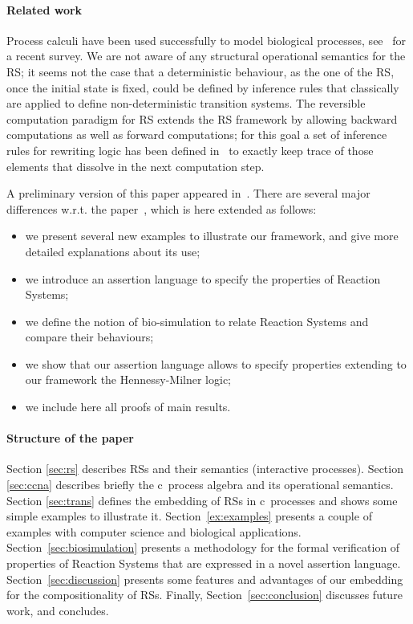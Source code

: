 \paragraph{Related work}

Process calculi have been used successfully to model
biological processes, see~\cite{BBDFH18} for a recent survey.
We are not aware of any 
structural operational semantics for the RS; it seems not the case
that a deterministic behaviour, as the one of the RS, once the initial state is 
fixed, could be defined by inference rules that classically are applied 
to define non-deterministic transition systems.
The reversible computation paradigm for RS extends the RS framework  by
allowing  backward computations as well as forward computations; for this 
goal a set of inference rules for rewriting logic has been 
defined in~\cite{10.1007/978-3-319-73359-3_3}
to exactly keep trace of those elements that  dissolve in the next 
computation step.


A preliminary version of this paper appeared in~\cite{BBF19}.
There are several major differences w.r.t. the paper~\cite{BBF19}, which is here extended as follows:
\begin{itemize}
\item we present several new examples to illustrate our framework,
and give more detailed explanations about its use;
\item we introduce an assertion language to specify the properties of Reaction Systems;
\item we define the notion of bio-simulation to relate Reaction Systems and compare their behaviours;
\item we show that our assertion language allows to specify properties extending to our
framework the Hennessy-Milner logic;
\item we include here all proofs of main results.
\end{itemize}
 
\paragraph{Structure of the paper} 

Section \ref{sec:rs} 
describes RSs and their semantics (interactive processes).
Section \ref{sec:ccna} describes briefly the c\CNA \ process algebra and
its operational semantics.
Section \ref{sec:trans} defines the embedding of RSs in
c\CNA \ processes and shows some simple examples to illustrate 
it.
Section~\ref{ex:examples} presents a couple of examples with computer science and biological applications.
Section~\ref{sec:biosimulation} presents a methodology for the formal verification of
properties of Reaction Systems that are expressed in a novel assertion language.
Section~\ref{sec:discussion} presents some features and 
advantages of our embedding for the compositionality of RSs.
Finally, Section~\ref{sec:conclusion}
discusses future work, and concludes.


